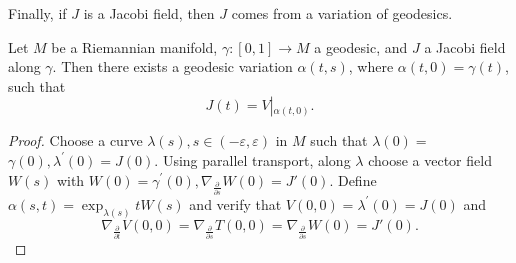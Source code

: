 \documentclass{ctexart}
\begin{document}
Finally, if $J$ is a Jacobi field, then $J$ comes from a variation of geodesics.
\begin{proposition}
  Let $M$ be a Riemannian manifold, $\gamma:[0,1] \rightarrow M$ a geodesic, and $J$ a Jacobi field along $\gamma$. Then there exists 
  a geodesic variation $\alpha(t, s)$, where $\alpha(t, 0)=\gamma(t)$, such that 
  $$
  J(t)=V \left|_{\alpha(t, 0)}\right..
  $$
\end{proposition}
\begin{proof}[Proof]
  Choose a curve $\lambda(s), s \in(-\varepsilon, \varepsilon)$ in $M$ such that $\lambda(0)=$ $\gamma(0), \lambda^{\prime}(0)=J(0)$. 
  Using parallel transport, along $\lambda$ choose a vector field $W(s)$ with $W(0)=\gamma^{\prime}(0), \nabla_{\frac{\partial}{\partial s}}W(0)=J'(0)$. 
  Define $\alpha(s, t)=\exp _{\lambda(s)} t W(s)$ and verify that $V(0,0)=\lambda^{\prime}(0)=J(0)$ and
  $$
  \nabla_{\frac{\partial}{\partial t}} V(0,0)=\nabla_{\frac{\partial}{\partial s}} T(0,0)=\nabla_{\frac{\partial}{\partial s}}W(0)=J'(0).
  $$
\end{proof}

\end{document}
